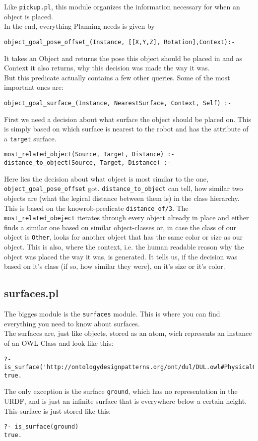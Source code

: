 \documentclass[main.tex]{subfiles}
\begin{document}
Like \texttt{pickup.pl}, this module organizes the information necessary for when an object is placed.\\

In the end, everything Planning needs is given by
\begin{lstlisting}
object_goal_pose_offset_(Instance, [[X,Y,Z], Rotation],Context):-
\end{lstlisting}
It takes an Object and returns the pose this object should be placed in and as Context it also returns, why this decision was made the way it was.\\
But this predicate actually contains a few other queries. Some of the most important ones are:

\begin{lstlisting}
object_goal_surface_(Instance, NearestSurface, Context, Self) :-
\end{lstlisting}
First we need a decision about what surface the object should be placed on. This is simply based on which surface is nearest to the robot and has the attribute of a \texttt{target} surface.
\begin{lstlisting}
most_related_object(Source, Target, Distance) :-
distance_to_object(Source, Target, Distance) :-
\end{lstlisting}

Here lies the decision about what object is most similar to the one, \texttt{object\_goal\_pose\_offset} got. \texttt{distance\_to\_object} can tell, how similar two objects are (what the legical distance between them is) in the class hierarchy. This is based on the knowrob-predicate \texttt{distance\_of/3}. The \texttt{most\_related\_obeject} iterates through every object already in place and either finds a similar one based on similar object-classes or, in case the class of our object is \texttt{Other}, looks for another object that has the same color or size as our object. This is also, where the context, i.e. the human readable reason why the object was placed the way it was, is generated. It tells us, if the decision was based on it's class (if so, how similar they were), on it's size or it's color.

\subsection{surfaces.pl}

The bigges module is the \texttt{surfaces} module. This is where you can find everything you need to know about surfaces.\\
The surfaces are, just like objects, stored as an atom, wich represents an instance of an OWL-Class and look like this:
\begin{lstlisting}
?- is_surface('http://ontologydesignpatterns.org/ont/dul/DUL.owl#PhysicalObject_UHOJSVEC')
true.
\end{lstlisting}
The only exception is the surface \texttt{ground}, which has no representation in the URDF, and is just an infinite surface that is everywhere below a certain height. This surface is just stored like this:
\begin{lstlisting}
?- is_surface(ground)
true.
\end{lstlisting}
\end{document}
